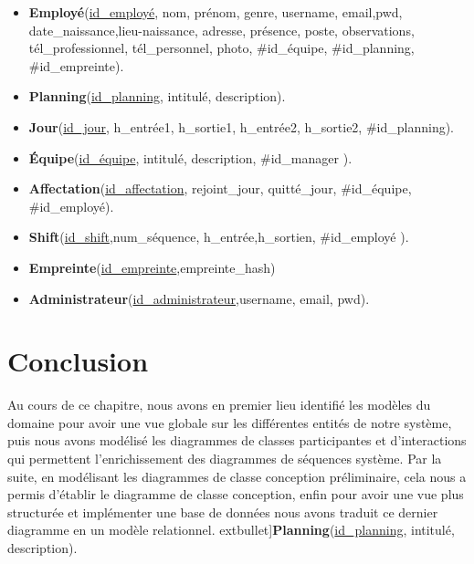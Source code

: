 \begin{itemize}
\begin{itemize}
    \item [\textbullet]\textbf{Employé}(\underline{id\_employé}, nom, prénom, genre, username, email,pwd, date\_naissance,lieu-naissance, adresse, présence, poste, observations, tél\_professionnel, tél\_personnel, photo, \#id\_équipe, \#id\_planning, \#id\_empreinte).
    
    \item [\textbullet]\textbf{Planning}(\underline{id\_planning}, intitulé, description).
    
    \item [\textbullet]\textbf{Jour}(\underline{id\_jour}, h\_entrée1, h\_sortie1, h\_entrée2, h\_sortie2, \#id\_planning).
    
    \item [\textbullet]\textbf{Équipe}(\underline{id\_équipe}, intitulé, description, \#id\_manager ).
    
    \item [\textbullet]\textbf{Affectation}(\underline{id\_affectation}, rejoint\_jour, quitté\_jour, \#id\_équipe, \#id\_employé).
    
    \item [\textbullet]\textbf{Shift}(\underline{id\_shift},num\_séquence, h\_entrée,h\_sortien, \#id\_employé ).
    
    \item [\textbullet]\textbf{Empreinte}(\underline{id\_empreinte},empreinte\_hash)
    
    \item [\textbullet]\textbf{Administrateur}(\underline{id\_administrateur},username, email, pwd).
\end{itemize}


\section{Conclusion}
Au cours de ce chapitre, nous avons en premier lieu identifié les modèles du domaine pour avoir une vue globale sur les différentes entités de notre système, puis nous avons modélisé les diagrammes de classes participantes et d’interactions qui permettent l’enrichissement des diagrammes de séquences système. Par la suite, en modélisant les diagrammes de classe conception préliminaire, cela nous a permis d’établir le diagramme de classe conception, enfin pour avoir une vue plus structurée et implémenter une base de données nous avons traduit ce dernier diagramme en un modèle relationnel. 
extbullet]\textbf{Planning}(\underline{id\_planning}, intitulé, description).
    

\end{itemize}
